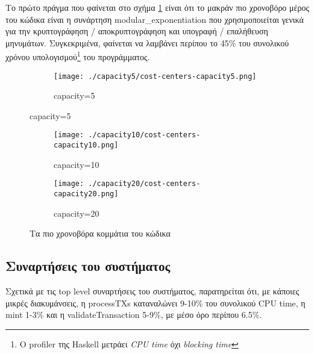 \documentclass{article}
\newcommand{\eng}[1]{\foreignlanguage{english}{#1}} %
\begin{document}
Το πρώτο πράγμα που φαίνεται στο σχήμα \ref{fig:throughput-cost-centers} είναι
ότι το μακράν πιο χρονοβόρο μέρος του κώδικα είναι η συνάρτηση
\eng{modular\_exponentiation} που χρησιμοποιείται γενικά για την κρυπτογράφηση
/ αποκρυπτογράφηση και υπογραφή / επαλήθευση μηνυμάτων. Συγκεκριμένα, φαίνεται
να λαμβάνει περίπου το 45\% του συνολικού χρόνου υπολογισμού\footnote{Ο
\eng{profiler} της \eng{Haskell} μετράει \emph{\eng{CPU time}} όχι
\emph{\eng{blocking time}}} του προγράμματος.

\graphicspath{{../experiments/profiled\_outputs/docker/throughput/}}

\begin{figure}[ht]
    \centering
    \begin{subfigure}{\textwidth}
        \texttt{[image: ./capacity5/cost-centers-capacity5.png]}
        \caption{\eng{capacity=5}}
    \end{subfigure}
\end{figure}
\begin{figure}[ht]
    \ContinuedFloat
    \begin{subfigure}{\textwidth}
        \texttt{[image: ./capacity10/cost-centers-capacity10.png]}
        \caption{\eng{capacity=10}}
    \end{subfigure}
    \begin{subfigure}{\textwidth}
        \texttt{[image: ./capacity20/cost-centers-capacity20.png]}
        \caption{\eng{capacity=20}}
    \end{subfigure}
    \caption{Τα πιο χρονοβόρα κομμάτια του κώδικα}
    \label{fig:throughput-cost-centers}
\end{figure}
\FloatBarrier

\subsection{Συναρτήσεις του συστήματος}

Σχετικά με τις \eng{top level} συναρτήσεις του συστήματος, παρατηρείται ότι, με
κάποιες μικρές διακυμάνσεις, η \eng{processTXs} καταναλώνει 9-10\% του
συνολικού \eng{CPU time}, η \eng{mint} 1-3\% και η \eng{validateTransaction}
5-9\%, με μέσο όρο περίπου 6.5\%. 
\end{document}
